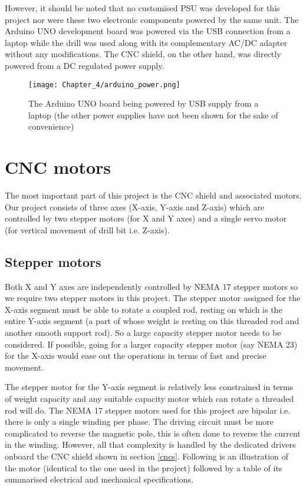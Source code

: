 However, it should be noted that no customised PSU was developed for this project nor were these two electronic components powered by the same unit. The Arduino UNO development board was powered via the USB connection from a laptop while the drill was used along with its complementary AC/DC adapter without any modifications. The CNC shield, on the other hand, was directly powered from a DC regulated power supply.

\begin{figure}[h]
 \centering
 \texttt{[image: Chapter\_4/arduino\_power.png]}
 \caption{The Arduino UNO board being powered by USB supply from a laptop (the other power supplies have not been shown for the sake of convenience)}
 \label{fig:arduino_supply}
\end{figure}

\section{CNC motors}

The most important part of this project is the CNC shield and associated motors. Our project consists of three axes (X-axis, Y-axis and Z-axis) which are controlled by two stepper motors (for X and Y axes) and a single servo motor (for vertical movement of drill bit i.e. Z-axis).

\subsection{Stepper motors} \label{step_motors}

Both X and Y axes are independently controlled by NEMA 17 stepper motors so we require two stepper motors in this project. The stepper motor assigned for the X-axis segment must be able to rotate a coupled rod, resting on which is the entire Y-axis segment (a part of whose weight is resting on this threaded rod and another smooth support rod). So a large capacity stepper motor needs to be considered. If possible, going for a larger capacity stepper motor (say NEMA 23) for the X-axis would ease out the operations in terms of fast and precise movement. \par

The stepper motor for the Y-axis segment is relatively less constrained in terms of weight capacity and any suitable capacity motor which can rotate a threaded rod will do. The NEMA 17 stepper motors used for this project are bipolar i.e. there is only a single winding per phase. The driving circuit must be more complicated to reverse the magnetic pole, this is often done to reverse the current in the winding. However, all that complexity is handled by the dedicated drivers onboard the CNC shield shown in section \ref{cncs}. Following is an illustration of the motor (identical to the one used in the project) followed by a table of its summarised electrical and mechanical specifications.

